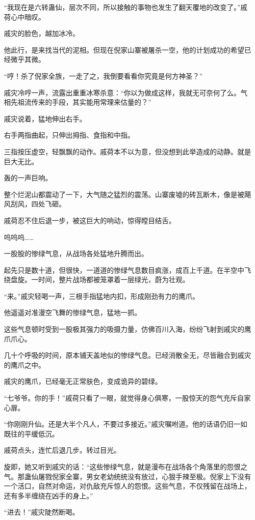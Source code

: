 \begin{this_body}
“我现在是六转蛊仙，层次不同，所以接触的事物也发生了翻天覆地的改变了。”戚荷心中暗叹。

戚灾的脸色，越加冰冷。

他此行，是来找当代的泥相。但现在倪家山寨被屠杀一空，他的计划成功的希望已经微乎其微。

“哼！杀了倪家全族，一走了之，我倒要看看你究竟是何方神圣？”

戚灾冷哼一声，流露出重重冰寒杀意：“你以为做成这样，我就无可奈何了么。气相先祖流传来的手段，其实能用常理来估量的？”

戚灾说着，猛地伸出右手。

右手两指曲起，只伸出拇指、食指和中指。

三指按压虚空，轻飘飘的动作。戚荷本不以为意，但没想到此举造成的动静。就是巨大无比。

轰的一声巨响。

整个烂泥山都震动了一下，大气随之猛烈的震荡。山寨废墟的砖瓦断木，像是被飓风刮风，四处飞砸。

戚荷忍不住后退一步，被这巨大的响动，惊得瞠目结舌。

呜呜呜……

一股股的惨绿气息，从战场各处猛地升腾而出。

起先只是数十道，但很快，一道道的惨绿气息数目疯涨，成百上千道。在半空中飞绕盘旋。一时间，整片战场都被笼罩着一层绿光，蔚为壮观。

“来。”戚灾轻喝一声，三根手指猛地内扣，形成刚劲有力的鹰爪。

他遥遥对准漫空飞舞的惨绿气息，猛地一抓。

这些气息顿时受到一股极其强力的吸摄力量，仿佛百川入海，纷纷飞射到戚灾的鹰爪爪心。

几十个呼吸的时间，原本铺天盖地似的惨绿气息。已经消散全无，尽皆融合到戚灾的鹰爪之中。

戚灾的鹰爪，已经毫无正常肤色，变成诡异的碧绿。

“七爷爷。你的手！”戚荷只看了一眼，就觉得身心俱寒，一股惊天的怨气充斥自家心扉。

“你刚刚升仙。还是大半个凡人，不要过多接近。”戚灾嘱咐道。他的话语仍旧一如既往的平缓低沉。

戚荷点头，连忙后退几步。转过目光。

旋即，她又听到戚灾的话：“这些惨绿气息，就是漫布在战场各个角落里的怨恨之气。那蛊仙屠戮倪家全寨，男女老幼统统没有放过，心狠手辣至极。倪家上下没有一个活口，自然对命运，对仇敌充斥惊人的怨恨。这些气息，不仅残留在战场上，还有多半缠绕在凶手的身上。”

“进去！”戚灾陡然断喝。


\end{this_body}
